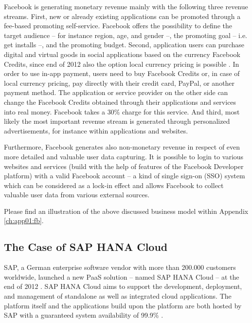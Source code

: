 Facebook is generating monetary revenue mainly with the following three revenue streams. First, new or already existing applications can be promoted through a fee-based promoting self-service. Facebook offers the possibility to define the target audience -- for instance region, age, and gender --, the promoting goal -- i.e. get installs --, and the promoting budget. Second, application users can purchase digital and virtual goods in social applications based on the currency Facebook Credits, since end of 2012 also the option local currency pricing is possible \citep{Facebook2013a}. In order to use in-app payment, users need to buy Facebook Credits or, in case of local currency pricing, pay directly with their credit card, PayPal, or another payment method. The application or service provider on the other side can change the Facebook Credits obtained through their applications and services into real money. Facebook takes a 30\% charge for this service. And third, most likely the most important revenue stream is generated through personalized advertisements, for instance within applications and websites.

Furthermore, Facebook generates also non-monetary revenue in respect of even more detailed and valuable user data capturing. It is possible to login to various websites and services (build with the help of features of the Facebook Developer platform) with a valid Facebook account -- a kind of single sign-on (SSO) system which can be considered as a lock-in effect and allows Facebook to collect valuable user data from various external sources.

Please find an illustration of the above discussed business model within Appendix \ref{ch:app01:fb}.

%

\subsection{The Case of SAP HANA Cloud}\label{ch:sota:sap}

SAP, a German enterprise software vendor with more than 200.000 customers worldwide, launched a new \ac{PaaS} solution -- named SAP HANA Cloud -- at the end of 2012 \citep{SAP2013b,SAP2013a}. SAP HANA Cloud aims to support the development, deployment, and management of standalone as well as integrated cloud applications. The platform itself and the applications build upon the platform are both hosted by SAP with a guaranteed system availability of 99.9\% \citep{SAP2013b}.

